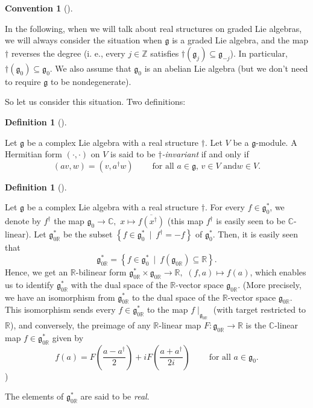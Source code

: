 \documentclass
[numbers=enddot,12pt,final,onecolumn,german,notitlepage]{scrartcl}%
\theoremstyle{definition}
\newtheorem{defi}[theo]{Definition}
\newenvironment{definition}[1][]
{\begin{defi}[#1]\begin{leftbar}}
{\end{leftbar}\end{defi}}
\newtheorem{conv}[theo]{Convention}
\newenvironment{Convention}[1][]
{\begin{conv}[#1]\begin{leftbar}}
{\end{leftbar}\end{conv}}
\begin{document}
\begin{Convention}
In the following, when we will talk about real structures on graded Lie
algebras, we will always consider the situation when $\mathfrak{g}$ is a
graded Lie algebra, and the map $\dag$ reverses the degree (i. e., every
$j\in\mathbb{Z}$ satisfies $\dag\left(  \mathfrak{g}_{j}\right)
\subseteq\mathfrak{g}_{-j}$). In particular, $\dag\left(  \mathfrak{g}%
_{0}\right)  \subseteq\mathfrak{g}_{0}$. We also assume that $\mathfrak{g}%
_{0}$ is an abelian Lie algebra (but we don't need to require $\mathfrak{g}$
to be nondegenerate).
\end{Convention}

So let us consider this situation. Two definitions:

\begin{definition}
Let $\mathfrak{g}$ be a complex Lie algebra with a real structure $\dag$. Let
$V$ be a $\mathfrak{g}$-module. A Hermitian form $\left(  \cdot,\cdot\right)
$ on $V$ is said to be $\dag$\textit{-invariant} if and only if%
\[
\left(  av,w\right)  =\left(  v,a^{\dag}w\right)
\ \ \ \ \ \ \ \ \ \ \text{for all }a\in\mathfrak{g}\text{, }v\in V\text{ and
}w\in V.
\]

\end{definition}

\begin{definition}
Let $\mathfrak{g}$ be a complex Lie algebra with a real structure $\dag$. For
every $f\in\mathfrak{g}_{0}^{\ast}$, we denote by $f^{\dag}$ the map
$\mathfrak{g}_{0}\rightarrow\mathbb{C},$ $x\mapsto\overline{f\left(  x^{\dag
}\right)  }$ (this map $f^{\dag}$ is easily seen to be $\mathbb{C}$-linear).
Let $\mathfrak{g}_{0\mathbb{R}}^{\ast}$ be the subset $\left\{  f\in
\mathfrak{g}_{0}^{\ast}\ \mid\ f^{\dag}=-f\right\}  $ of $\mathfrak{g}%
_{0}^{\ast}$. Then, it is easily seen that%
\[
\mathfrak{g}_{0\mathbb{R}}^{\ast}=\left\{  f\in\mathfrak{g}_{0}^{\ast}%
\ \mid\ f\left(  \mathfrak{g}_{0\mathbb{R}}\right)  \subseteq\mathbb{R}%
\right\}  .
\]
Hence, we get an $\mathbb{R}$-bilinear form $\mathfrak{g}_{0\mathbb{R}}^{\ast
}\times\mathfrak{g}_{0\mathbb{R}}\rightarrow\mathbb{R},$ $\left(  f,a\right)
\mapsto f\left(  a\right)  $, which enables us to identify $\mathfrak{g}%
_{0\mathbb{R}}^{\ast}$ with the dual space of the $\mathbb{R}$-vector space
$\mathfrak{g}_{0\mathbb{R}}$. (More precisely, we have an isomorphism from
$\mathfrak{g}_{0\mathbb{R}}^{\ast}$ to the dual space of the $\mathbb{R}%
$-vector space $\mathfrak{g}_{0\mathbb{R}}$. This isomorphism sends every
$f\in\mathfrak{g}_{0\mathbb{R}}^{\ast}$ to the map $f\mid_{\mathfrak{g}%
_{0\mathbb{R}}}$ (with target restricted to $\mathbb{R}$), and conversely, the
preimage of any $\mathbb{R}$-linear map $F:\mathfrak{g}_{0\mathbb{R}%
}\rightarrow\mathbb{R}$ is the $\mathbb{C}$-linear map $f\in\mathfrak{g}%
_{0\mathbb{R}}^{\ast}$ given by%
\[
f\left(  a\right)  =F\left(  \dfrac{a-a^{\dag}}{2}\right)  +iF\left(
\dfrac{a+a^{\dag}}{2i}\right)  \ \ \ \ \ \ \ \ \ \ \text{for all }%
a\in\mathfrak{g}_{0}.
\]
)

The elements of $\mathfrak{g}_{0\mathbb{R}}^{\ast}$ are said to be
\textit{real}.
\end{definition}
\end{document}
